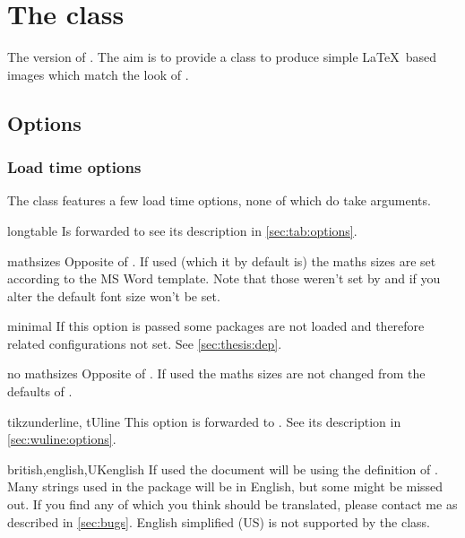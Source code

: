 \chapter{The  class}
The  version of . The aim is to provide a class
to produce simple \LaTeX\ based images which match the look of .

\section{Options}%
\subsection{Load time options}%
The class features a few load time options, none of which do take arguments.
\begin{describeopt}{longtable}
  Is forwarded to  see its description in \autoref{sec:tab:options}.
\end{describeopt}
\begin{describeopt}{mathsizes}
  Opposite of . If used (which it by default is) the maths
  sizes are set according to the MS Word template. Note that those weren't set
  by  and if you alter the default font size won't be set.
\end{describeopt}
\begin{describeopt}{minimal}
  If this option is passed some packages are not loaded and therefore related
  configurations not set. See \autoref{sec:thesis:dep}.
\end{describeopt}
\begin{describeopt}{no mathsizes}
  Opposite of . If used the maths sizes are not changed from the
  defaults of .
\end{describeopt}
\begin{describeopt}{tikzunderline, tUline}
  This option is forwarded to . See its description in
  \autoref{sec:wuline:options}.
\end{describeopt}
\begin{describeopt}{british,english,UKenglish}
  If used the document will be using the  definition of
  . Many strings used in the package will be in English, but some
  might be missed out. If you find any of which you think should be translated,
  please contact me as described in \autoref{sec:bugs}. English simplified (US)
  is not supported by the class.
\end{describeopt}

